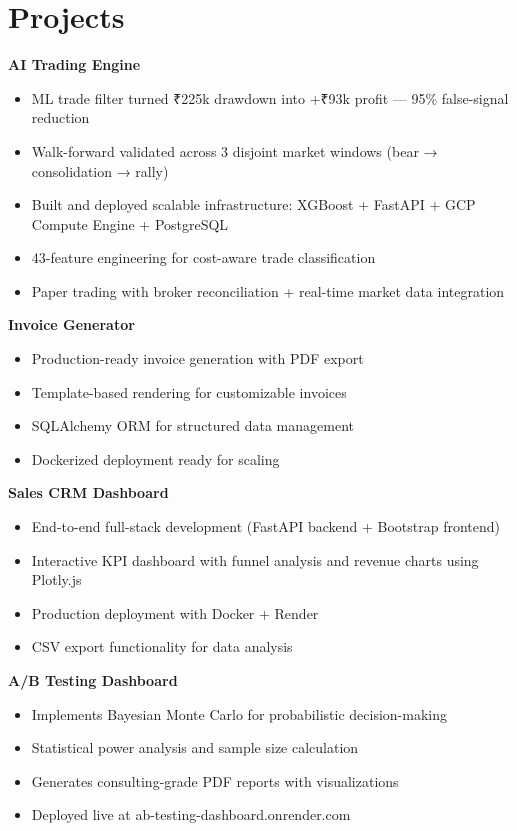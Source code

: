 \documentclass[11pt,a4paper]{article}
\begin{document}
\section*{Projects}
\noindent\textbf{AI Trading Engine} \hfill \href{https://github.com/jiyanshusingh/trading-engine}{\faGithub}
\begin{itemize}
    \item ML trade filter turned ₹225k drawdown into +₹93k profit — 95\% false-signal reduction
    \item Walk-forward validated across 3 disjoint market windows (bear → consolidation → rally)
    \item Built and deployed scalable infrastructure: XGBoost + FastAPI + GCP Compute Engine + PostgreSQL
    \item 43-feature engineering for cost-aware trade classification
    \item Paper trading with broker reconciliation + real-time market data integration
\end{itemize}

\noindent\textbf{Invoice Generator} \hfill \href{https://github.com/jiyanshusingh/invoice-generator}{\faGithub}
\begin{itemize}
    \item Production-ready invoice generation with PDF export
    \item Template-based rendering for customizable invoices
    \item SQLAlchemy ORM for structured data management
    \item Dockerized deployment ready for scaling
\end{itemize}

\noindent\textbf{Sales CRM Dashboard} \hfill \href{https://sales-dashboard-x5nm.onrender.com}{\faGlobe} \href{https://github.com/jiyanshusingh/sales_dashboard}{\faGithub}
\begin{itemize}
    \item End-to-end full-stack development (FastAPI backend + Bootstrap frontend)
    \item Interactive KPI dashboard with funnel analysis and revenue charts using Plotly.js
    \item Production deployment with Docker + Render
    \item CSV export functionality for data analysis
\end{itemize}

\noindent\textbf{A/B Testing Dashboard} \hfill \href{https://ab-testing-dashboard.onrender.com}{\faGlobe} \href{https://github.com/jiyanshusingh/ab-testing-dashboard}{\faGithub}
\begin{itemize}
    \item Implements Bayesian Monte Carlo for probabilistic decision-making
    \item Statistical power analysis and sample size calculation
    \item Generates consulting-grade PDF reports with visualizations
    \item Deployed live at ab-testing-dashboard.onrender.com
\end{itemize}
\end{document}
